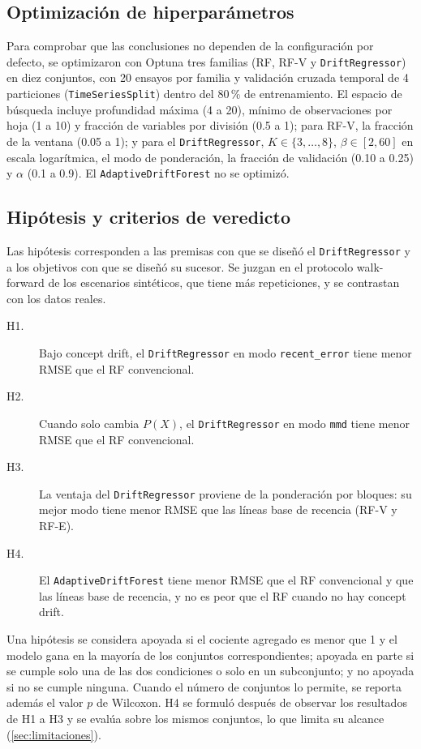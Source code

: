\documentclass[11pt,a4paper]{article}
\begin{document}
\subsection{Optimización de hiperparámetros}

Para comprobar que las conclusiones no dependen de la configuración por defecto, se optimizaron con
Optuna \parencite{akiba2019} tres familias (RF, RF-V y \texttt{DriftRegressor}) en diez conjuntos, con
20 ensayos por familia y validación cruzada temporal de 4 particiones (\texttt{TimeSeriesSplit})
dentro del 80\,\% de entrenamiento. El espacio de búsqueda incluye profundidad máxima (4 a 20), mínimo
de observaciones por hoja (1 a 10) y fracción de variables por división (0.5 a 1); para RF-V, la
fracción de la ventana (0.05 a 1); y para el \texttt{DriftRegressor}, $K\in\{3,\dots,8\}$,
$\beta\in[2,60]$ en escala logarítmica, el modo de ponderación, la fracción de validación (0.10 a
0.25) y $\alpha$ (0.1 a 0.9). El \texttt{AdaptiveDriftForest} no se optimizó.

\subsection{Hipótesis y criterios de veredicto}\label{sec:hipotesis}

Las hipótesis corresponden a las premisas con que se diseñó el \texttt{DriftRegressor} y a los
objetivos con que se diseñó su sucesor. Se juzgan en el protocolo walk-forward de los escenarios
sintéticos, que tiene más repeticiones, y se contrastan con los datos reales.

\begin{description}
  \item[H1.] Bajo concept drift, el \texttt{DriftRegressor} en modo \texttt{recent\_error} tiene menor
  RMSE que el RF convencional.
  \item[H2.] Cuando solo cambia $P(X)$, el \texttt{DriftRegressor} en modo \texttt{mmd} tiene menor
  RMSE que el RF convencional.
  \item[H3.] La ventaja del \texttt{DriftRegressor} proviene de la ponderación por bloques: su mejor
  modo tiene menor RMSE que las líneas base de recencia (RF-V y RF-E).
  \item[H4.] El \texttt{AdaptiveDriftForest} tiene menor RMSE que el RF convencional y que las líneas
  base de recencia, y no es peor que el RF cuando no hay concept drift.
\end{description}

Una hipótesis se considera apoyada si el cociente agregado es menor que 1 y el modelo gana en la
mayoría de los conjuntos correspondientes; apoyada en parte si se cumple solo una de las dos
condiciones o solo en un subconjunto; y no apoyada si no se cumple ninguna. Cuando el número de
conjuntos lo permite, se reporta además el valor $p$ de Wilcoxon. H4 se formuló después de observar
los resultados de H1 a H3 y se evalúa sobre los mismos conjuntos, lo que limita su alcance
(\cref{sec:limitaciones}).
\end{document}
